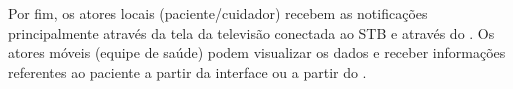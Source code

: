 

Por fim, os atores locais (paciente/cuidador) 
recebem as notificações principalmente através da tela da televisão conectada ao 
STB e através do \smartphone. Os atores móveis (equipe de saúde) podem visualizar 
os dados e receber informações referentes ao paciente a partir da interface \web[] ou 
a partir do \smartphone.




